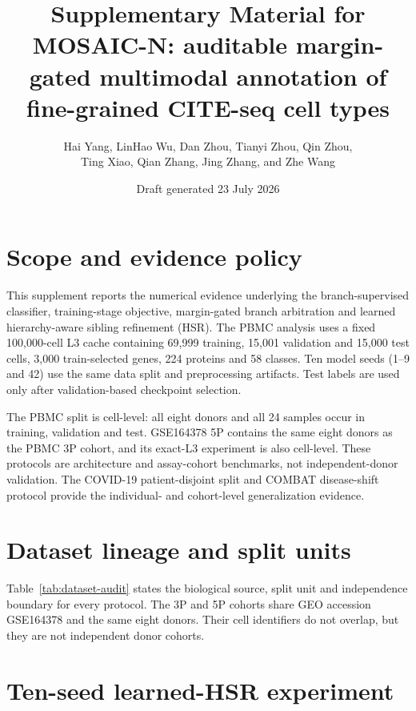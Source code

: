 \documentclass[10pt]{article}
\title{Supplementary Material for\\
MOSAIC-N: auditable margin-gated multimodal annotation of fine-grained CITE-seq cell types}
\author{Hai Yang, LinHao Wu, Dan Zhou, Tianyi Zhou, Qin Zhou,\\
Ting Xiao, Qian Zhang, Jing Zhang, and Zhe Wang}
\date{Draft generated 23 July 2026}
\begin{document}
\maketitle

\section{Scope and evidence policy}

This supplement reports the numerical evidence underlying the branch-supervised classifier, training-stage objective, margin-gated branch arbitration and learned hierarchy-aware sibling refinement (HSR). The PBMC analysis uses a fixed 100,000-cell L3 cache containing 69,999 training, 15,001 validation and 15,000 test cells, 3,000 train-selected genes, 224 proteins and 58 classes. Ten model seeds (1--9 and 42) use the same data split and preprocessing artifacts. Test labels are used only after validation-based checkpoint selection.

The PBMC split is cell-level: all eight donors and all 24 samples occur in training, validation and test. GSE164378 5P contains the same eight donors as the PBMC 3P cohort, and its exact-L3 experiment is also cell-level. These protocols are architecture and assay-cohort benchmarks, not independent-donor validation. The COVID-19 patient-disjoint split and COMBAT disease-shift protocol provide the individual- and cohort-level generalization evidence.

\section{Dataset lineage and split units}

Table~\ref{tab:dataset-audit} states the biological source, split unit and independence boundary for every protocol. The 3P and 5P cohorts share GEO accession GSE164378 and the same eight donors. Their cell identifiers do not overlap, but they are not independent donor cohorts.

\begin{table}[H]
\centering
\caption{Dataset lineage, split unit and independence boundary.}
\label{tab:dataset-audit}
\scriptsize
\setlength{\tabcolsep}{2.2pt}
\resizebox{\textwidth}{!}{%

}
\end{table}

\section{Ten-seed learned-HSR experiment}
\end{document}

